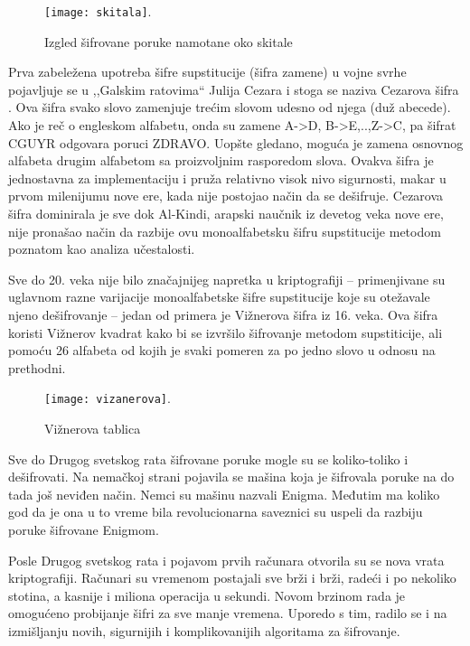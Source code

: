 \documentclass[a4paper]{article}
\begin{document}
\begin{figure}[h!]
    \centering
    \texttt{[image: skitala]}.
    \caption{Izgled šifrovane poruke namotane oko skitale}
    \label{fig:skitala}
\end{figure}

Prva zabeležena upotreba šifre supstitucije (šifra zamene) u vojne svrhe pojavljuje se u ,,Galskim ratovima“ Julija Cezara i stoga se naziva Cezarova šifra \cite{Kriptografija_wiki}. Ova šifra svako slovo zamenjuje trećim slovom udesno od njega (duž abecede). Ako je reč o engleskom alfabetu, onda su zamene A->D, B->E,..,Z->C, pa šifrat CGUYR odgovara poruci ZDRAVO. Uopšte gledano, moguća je zamena osnovnog alfabeta drugim alfabetom sa proizvoljnim rasporedom slova. Ovakva šifra je jednostavna za implementaciju i pruža relativno visok nivo sigurnosti, makar u prvom milenijumu nove ere, kada nije postojao način da se dešifruje. Cezarova šifra dominirala je sve dok Al-Kindi, arapski naučnik iz devetog veka nove ere, nije pronašao način da razbije ovu monoalfabetsku šifru supstitucije metodom poznatom kao analiza učestalosti.

Sve do 20. veka nije bilo značajnijeg napretka u kriptografiji – primenjivane su uglavnom razne varijacije monoalfabetske šifre supstitucije koje su otežavale njeno dešifrovanje – jedan od primera je Vižnerova šifra iz 16. veka. Ova šifra koristi Vižnerov kvadrat kako bi se izvršilo šifrovanje metodom supstiticije, ali pomoću 26 alfabeta od kojih je svaki pomeren za po jedno slovo u odnosu na prethodni. 

\begin{figure}[h!]
    \centering
    \texttt{[image: vizanerova]}.
    \caption{Vižnerova tablica}
    \label{fig:vizanerova}
\end{figure}

\newpage
Sve do Drugog svetskog rata šifrovane poruke mogle su se koliko-toliko i dešifrovati. Na nemačkoj strani pojavila se mašina koja je šifrovala poruke na do tada još neviđen način. Nemci su mašinu nazvali Enigma. Međutim ma koliko god da je ona u to vreme bila revolucionarna saveznici su uspeli da razbiju poruke šifrovane Enigmom.

Posle Drugog svetskog rata i pojavom prvih računara otvorila su se nova vrata kriptografiji. Računari su vremenom postajali sve brži i brži, radeći i po nekoliko stotina, a kasnije i miliona operacija u sekundi. Novom brzinom rada je omogućeno probijanje šifri za sve manje vremena. Uporedo s tim, radilo se i na izmišljanju novih, sigurnijih i komplikovanijih algoritama za šifrovanje.
\end{document}
